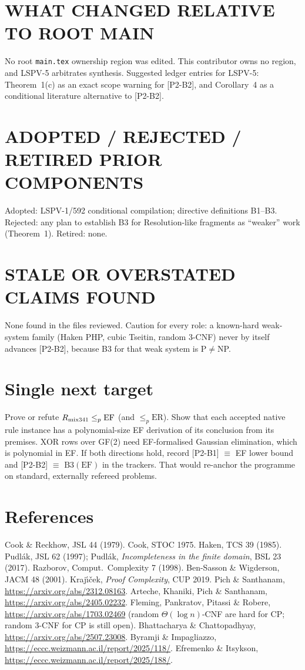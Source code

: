 \documentclass[11pt]{article}
\newcommand{\Bthree}{\mathrm{B3}}
\begin{document}
\section*{WHAT CHANGED RELATIVE TO ROOT MAIN}
No root \texttt{main.tex} ownership region was edited. This contributor
owns no region, and LSPV-5 arbitrates synthesis. Suggested ledger entries
for LSPV-5: Theorem~1(c) as an exact scope warning for [P2-B2], and
Corollary~4 as a conditional literature alternative to [P2-B2].

\section*{ADOPTED / REJECTED / RETIRED PRIOR COMPONENTS}
Adopted: LSPV-1/592 conditional compilation; directive definitions B1--B3.
Rejected: any plan to establish B3 for Resolution-like fragments as
``weaker'' work (Theorem~1). Retired: none.

\section*{STALE OR OVERSTATED CLAIMS FOUND}
None found in the files reviewed. Caution for every role: a known-hard
weak-system family (Haken PHP, cubic Tseitin, random 3-CNF) never by
itself advances [P2-B2], because B3 for that weak system is P$\neq$NP.

\section*{Single next target}
Prove or refute $R_{\rm mix341}\le_p\mathrm{EF}$ (and $\le_p\mathrm{ER}$).
Show that each accepted native rule instance has a polynomial-size EF
derivation of its conclusion from its premises. XOR rows over GF(2) need
EF-formalised Gaussian elimination, which is polynomial in EF. If both
directions hold, record [P2-B1] $\equiv$ EF lower bound and
[P2-B2] $\equiv$ $\Bthree(\mathrm{EF})$ in the trackers. That would
re-anchor the programme on standard, externally refereed problems.

\section*{References}
Cook \& Reckhow, JSL 44 (1979). Cook, STOC 1975. Haken, TCS 39 (1985).
Pudl\'ak, JSL 62 (1997); Pudl\'ak, \emph{Incompleteness in the finite
domain}, BSL 23 (2017). Razborov, Comput.\ Complexity 7 (1998).
Ben-Sasson \& Wigderson, JACM 48 (2001). Kraj\'{\i}\v{c}ek,
\emph{Proof Complexity}, CUP 2019. Pich \& Santhanam,
\url{https://arxiv.org/abs/2312.08163}. Arteche, Khaniki, Pich \& Santhanam,
\url{https://arxiv.org/abs/2405.02232}. Fleming, Pankratov, Pitassi \&
Robere, \url{https://arxiv.org/abs/1703.02469} (random $\Theta(\log n)$-CNF
are hard for CP; random 3-CNF for CP is still open). Bhattacharya \&
Chattopadhyay, \url{https://arxiv.org/abs/2507.23008}. Byramji \&
Impagliazzo, \url{https://eccc.weizmann.ac.il/report/2025/118/}.
Efremenko \& Itsykson, \url{https://eccc.weizmann.ac.il/report/2025/188/}.
\end{document}
